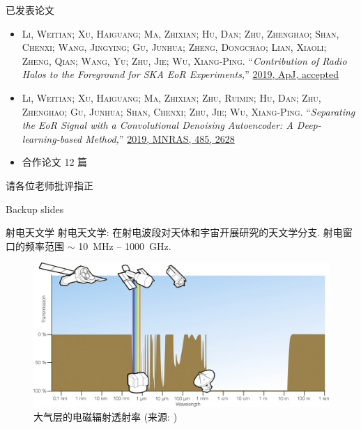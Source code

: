 \documentclass{beamer}
\newcommand{\citeay}[1]{\citeauthor{#1} \citeyear{#1} \parencite{#1}}
\begin{document}
\begin{frame}{已发表论文}
  \small
  \begin{itemize}
    \item
      \textsc{\alert{Li, Weitian}; Xu, Haiguang; Ma, Zhixian; Hu, Dan;
      Zhu, Zhenghao; Shan, Chenxi; Wang, Jingying; Gu, Junhua;
      Zheng, Dongchao; Lian, Xiaoli; Zheng, Qian; Wang, Yu;
      Zhu, Jie; Wu, Xiang-Ping}.
      \enquote{\it Contribution of Radio Halos to the Foreground for
        SKA EoR Experiments,}
      \href{http://adsabs.harvard.edu/abs/arXiv:1905.05399}{%
        2019, ApJ, accepted}
    \item
      \textsc{\alert{Li, Weitian}; Xu, Haiguang; Ma, Zhixian; Zhu, Ruimin;
      Hu, Dan; Zhu, Zhenghao; Gu, Junhua; Shan, Chenxi; Zhu, Jie;
      Wu, Xiang-Ping}.
      \enquote{\it Separating the EoR Signal with a Convolutional Denoising
        Autoencoder: A Deep-learning-based Method,}
      \href{http://adsabs.harvard.edu/abs/2019MNRAS.485.2628L}{%
        2019, MNRAS, 485, 2628}
    \item
      合作论文 12 篇
  \end{itemize}
\end{frame}

\begin{frame}[standout]
  \Huge 请各位老师批评指正
\end{frame}


\appendix

\begin{frame}[standout]
  Backup slides
\end{frame}

\begin{frame}{射电天文学}
  \alert{射电天文学}:
  在射电波段对天体和宇宙开展研究的天文学分支.
  \alert{射电窗口}的频率范围 $\sim$ \SI{10}{\MHz} -- \SI{1000}{\GHz}.

  \begin{figure}
    \centering
    \includegraphics[width=\textwidth]{atmospheric-em-transmittance}
    \caption{大气层的电磁辐射透射率 (来源: \citeay{condon2016})}
  \end{figure}
\end{frame}
\end{document}
